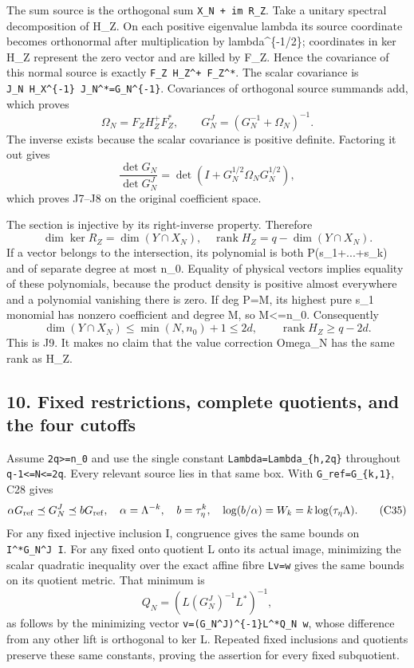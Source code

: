 The sum source is the orthogonal sum \texttt{X\_N\ +\ im\ R\_Z}. Take a unitary spectral decomposition of H\_Z. On each positive eigenvalue lambda its source coordinate becomes orthonormal after multiplication by lambda\^{}\{-1/2\}; coordinates in ker H\_Z represent the zero vector and are killed by F\_Z. Hence the covariance of this normal source is exactly \texttt{F\_Z\ H\_Z\^{}+\ F\_Z\^{}*}. The scalar covariance is \texttt{J\_N\ H\_X\^{}\{-1\}\ J\_N\^{}*=G\_N\^{}\{-1\}}. Covariances of orthogonal source summands add, which proves \[
\Omega_N=F_ZH_Z^+F_Z^*,\qquad
G_N^J=(G_N^{-1}+\Omega_N)^{-1}.
\tag{C32}
\] The inverse exists because the scalar covariance is positive definite. Factoring it out gives \[
\frac{\det G_N}{\det G_N^J}
=\det(I+G_N^{1/2}\Omega_NG_N^{1/2}),
\tag{C33}
\] which proves J7--J8 on the original coefficient space.

The section is injective by its right-inverse property. Therefore \[
\dim\ker R_Z=\dim(Y\cap X_N),\quad
\operatorname{rank}H_Z=q-\dim(Y\cap X_N).
\] If a vector belongs to the intersection, its polynomial is both P(s\_1+...+s\_k) and of separate degree at most n\_0. Equality of physical vectors implies equality of these polynomials, because the product density is positive almost everywhere and a polynomial vanishing there is zero. If deg P=M, its highest pure s\_1 monomial has nonzero coefficient and degree M, so M\textless=n\_0. Consequently \[
\dim(Y\cap X_N)\le\min(N,n_0)+1\le2d,
\qquad \operatorname{rank}H_Z\ge q-2d.
\tag{C34}
\] This is J9. It makes no claim that the value correction Omega\_N has the same rank as H\_Z.

\subsection{10. Fixed restrictions, complete quotients, and the four cutoffs}\label{mrcoerc:fixed-restrictions-complete-quotients-and-the-four-cutoffs}

Assume \texttt{2q\textgreater{}=n\_0} and use the single constant \texttt{Lambda=Lambda\_\{h,2q\}} throughout \texttt{q-1\textless{}=N\textless{}=2q}. Every relevant source lies in that same box. With \texttt{G\_ref=G\_\{k,1\}}, C28 gives \[
\alpha G_{\rm ref}\preceq G_N^J\preceq bG_{\rm ref},
\quad \alpha=\Lambda^{-k},\quad b=\tau_\eta^k,
\quad \log(b/\alpha)=W_k=k\log(\tau_\eta\Lambda).
\tag{C35}
\] For any fixed injective inclusion I, congruence gives the same bounds on \texttt{I\^{}*G\_N\^{}J\ I}. For any fixed onto quotient L onto its actual image, minimizing the scalar quadratic inequality over the exact affine fibre \texttt{Lv=w} gives the same bounds on its quotient metric. That minimum is \[
Q_N=(L(G_N^J)^{-1}L^*)^{-1},
\] as follows by the minimizing vector \texttt{v=(G\_N\^{}J)\^{}\{-1\}L\^{}*Q\_N\ w}, whose difference from any other lift is orthogonal to ker L. Repeated fixed inclusions and quotients preserve these same constants, proving the assertion for every fixed subquotient.

